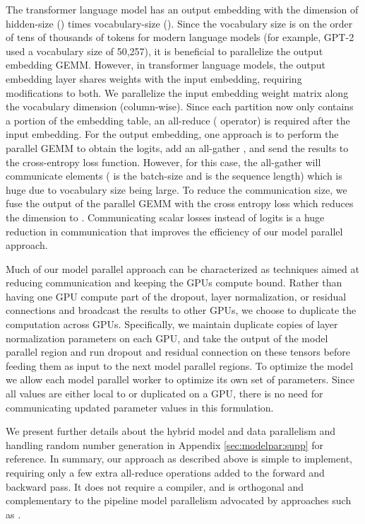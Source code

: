 \documentclass{article}
\begin{document}
The transformer language model has an output embedding with the dimension of hidden-size () times vocabulary-size (). Since the vocabulary size is on the order of tens of thousands of tokens for modern language models (for example, GPT-2 used a vocabulary size of 50,257), it is beneficial to parallelize the output embedding GEMM. However, in transformer language models, the output embedding layer shares weights with the input embedding, requiring modifications to both. We parallelize the input embedding weight matrix  along the vocabulary dimension  (column-wise). Since each partition now only contains a portion of the embedding table, an all-reduce ( operator) is required after the input embedding. For the output embedding, one approach is to perform the parallel GEMM  to obtain the logits, add an all-gather , and send the results to the cross-entropy loss function. However, for this case, the all-gather will communicate  elements ( is the batch-size and  is the sequence length) which is huge due to vocabulary size being large. To reduce the communication size, we fuse the output of the parallel GEMM  with the cross entropy loss which reduces the dimension to . Communicating scalar losses instead of logits is a huge reduction in communication that improves the efficiency of our model parallel approach.

Much of our model parallel approach can be characterized as techniques aimed at reducing communication and keeping the GPUs compute bound.
Rather than having one GPU compute part of the dropout, layer normalization, or residual connections and broadcast the results to other GPUs, we choose to duplicate the computation across GPUs. Specifically, we maintain duplicate copies of layer normalization parameters on each GPU, and take the output of the model parallel region and run dropout and residual connection on these tensors before feeding them as input to the next model parallel regions. To optimize the model we allow each model parallel worker to optimize its own set of parameters. Since all values are either local to or duplicated on a GPU, there is no need for communicating updated parameter values in this formulation.

We present further details about the hybrid model and data parallelism and handling random number generation in Appendix \ref{sec:modelpar:supp} for reference. In summary, our approach as described above is simple to implement, requiring only a few extra all-reduce operations added to the forward and backward pass. It does not require a compiler, and is orthogonal and complementary to the pipeline model parallelism advocated by approaches such as \cite{GPipe}. 
\end{document}
